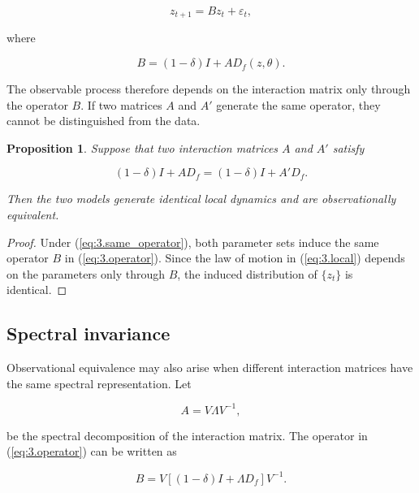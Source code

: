 \documentclass[12pt]{article}
\numberwithin{equation}{section}
\newtheorem{proposition}[theorem]{Proposition}
\begin{document}
\begin{equation}
z_{t+1}
=
B z_t
+
\varepsilon_t,
\label{eq:3.local}
\end{equation}

where

\begin{equation}
B
=
(1-\delta) I
+
A D_f(z,\theta).
\label{eq:3.operator}
\end{equation}

The observable process therefore depends on the interaction matrix only
through the operator $B$. If two matrices $A$ and $A'$ generate the same
operator, they cannot be distinguished from the data.

\begin{proposition}
Suppose that two interaction matrices $A$ and $A'$ satisfy

\begin{equation}
(1-\delta) I + A D_f
=
(1-\delta) I + A' D_f.
\label{eq:3.same_operator}
\end{equation}

Then the two models generate identical local dynamics and are
observationally equivalent.
\end{proposition}

\begin{proof}
Under (\ref{eq:3.same_operator}), both parameter sets induce the same
operator $B$ in (\ref{eq:3.operator}). Since the law of motion in
(\ref{eq:3.local}) depends on the parameters only through $B$, the induced
distribution of $\{z_t\}$ is identical.
\end{proof}

\subsection{Spectral invariance}

Observational equivalence may also arise when different interaction matrices
have the same spectral representation. Let

\begin{equation}
A = V \Lambda V^{-1},
\label{eq:3.spectral}
\end{equation}

be the spectral decomposition of the interaction matrix. The operator in
(\ref{eq:3.operator}) can be written as

\begin{equation}
B
=
V
\left[
(1-\delta) I
+
\Lambda D_f
\right]
V^{-1}.
\label{eq:3.spectral_B}
\end{equation}
\end{document}
